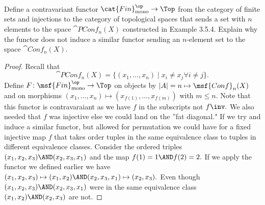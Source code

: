 \documentclass[main.tex]{subfiles}
\begin{document}
\paragraph{}
\begin{exercise}
	Define a contravariant functor $ \cat{Fin}_{\textrm{mono}}^\op \to
	\Top$ from 
	the	category of finite sets and injections to the category of
	topological 
	spaces that sends a set with $ n $ elements to the space $
	\cat{PConf}_n(X) $ 
	constructed in Example 3.5.4. Explain why the functor does not induce a 
	similar functor sending an $ n $-element set to the space $ \cat{Conf}_n(X). $
\end{exercise}
	
\begin{proof}
Recall that
$$
\cat{PConf}_n(X)=\{(x_1,\dots,x_n)\mid x_i\neq x_j \forall i\neq j
\}.
$$
Define $ F\colon\msf{Fin}_{\textrm{mono}}^\op \to \Top $ on objects by 
$|A|=n\mapsto \msf{Conf}_n(X)$ and on morphisms $ (x_1,\dots,x_n)\mapsto 
(x_{f(1)},\dots, x_{f(m)}) $ with $ m\leq n. $ Note that this functor is contravaraiant as
we have $ f $ in the subscripts not $ f\inv.$ We also needed that $ f $ was 
injective else we could land on the ''fat diagonal." If we try and induce a 
similar functor, but allowed for permutation we could have for a fixed 
injective map $ f$ that takes order tuples in the same equivalence class to
tuples in different equivalence classes. Consider the ordered triples
 $ (x_1,x_2,x_3) \AND (x_2,x_3,x_1)$ and the map $ f(1)=1\AND f(2)=2. $ 
 If we apply the functor we defined earlier we have 
 $ (x_1,x_2,x_3)\mapsto (x_1,x_2) \AND (x_2,x_3,x_1)\mapsto (x_2,x_3). $
 Even though $ (x_1,x_2,x_3) \AND (x_2,x_3,x_1)$ were in the same equivalence
 class $ (x_1,x_2)\AND (x_2,x_3) $ are not.
\end{proof}
\end{document}

